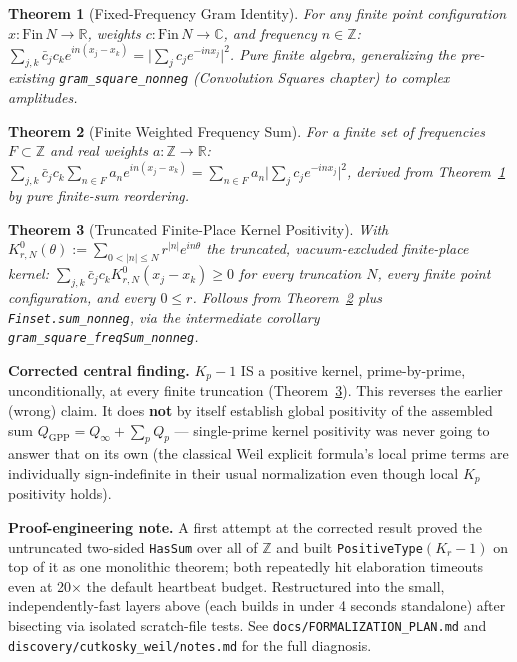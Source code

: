 \documentclass{report}
\newtheorem{theorem}{Theorem}[chapter]
\theoremstyle{definition}
\begin{document}
\begin{theorem}[Fixed-Frequency Gram Identity]
  \label{thm:gram-square-freq}
  \leanok
  For any finite point configuration $x:\mathrm{Fin}\,N\to\mathbb{R}$, weights
  $c:\mathrm{Fin}\,N\to\mathbb{C}$, and frequency $n\in\mathbb{Z}$:
  $\sum_{j,k}\bar c_jc_ke^{in(x_j-x_k)}=\bigl|\sum_jc_je^{-inx_j}\bigr|^2$. Pure finite
  algebra, generalizing the pre-existing \texttt{gram\_square\_nonneg}
  (Convolution Squares chapter) to complex amplitudes.
\end{theorem}

\begin{theorem}[Finite Weighted Frequency Sum]
  \label{thm:gram-square-freqsum}
  \leanok
  For a finite set of frequencies $F\subset\mathbb{Z}$ and real weights
  $a:\mathbb{Z}\to\mathbb{R}$: $\sum_{j,k}\bar c_jc_k\sum_{n\in F}a_ne^{in(x_j-x_k)}
  =\sum_{n\in F}a_n\bigl|\sum_jc_je^{-inx_j}\bigr|^2$, derived from
  Theorem~\ref{thm:gram-square-freq} by pure finite-sum reordering.
\end{theorem}

\begin{theorem}[Truncated Finite-Place Kernel Positivity]
  \label{thm:krn0-gram-nonneg}
  \leanok
  With $K^0_{r,N}(\theta):=\sum_{0<|n|\le N}r^{|n|}e^{in\theta}$ the truncated,
  vacuum-excluded finite-place kernel: $\sum_{j,k}\bar c_jc_kK^0_{r,N}(x_j-x_k)\geq0$
  for every truncation $N$, every finite point configuration, and every $0\le r$.
  Follows from Theorem~\ref{thm:gram-square-freqsum} plus \texttt{Finset.sum\_nonneg},
  via the intermediate corollary \texttt{gram\_square\_freqSum\_nonneg}.
\end{theorem}

\textbf{Corrected central finding.} $K_p-1$ IS a positive kernel, prime-by-prime,
unconditionally, at every finite truncation (Theorem~\ref{thm:krn0-gram-nonneg}). This
reverses the earlier (wrong) claim. It does \textbf{not} by itself establish global
positivity of the assembled sum $Q_{\mathrm{GPP}}=Q_\infty+\sum_p Q_p$ --- single-prime
kernel positivity was never going to answer that on its own (the classical Weil explicit
formula's local prime terms are individually sign-indefinite in their usual
normalization even though local $K_p$ positivity holds).

\textbf{Proof-engineering note.} A first attempt at the corrected result proved the
untruncated two-sided \texttt{HasSum} over all of $\mathbb{Z}$ and built
\texttt{PositiveType}$(K_r-1)$ on top of it as one monolithic theorem; both repeatedly
hit elaboration timeouts even at 20$\times$ the default heartbeat budget. Restructured
into the small, independently-fast layers above (each builds in under 4 seconds
standalone) after bisecting via isolated scratch-file tests. See
\texttt{docs/FORMALIZATION\_PLAN.md} and \texttt{discovery/cutkosky\_weil/notes.md} for
the full diagnosis.
\end{document}
